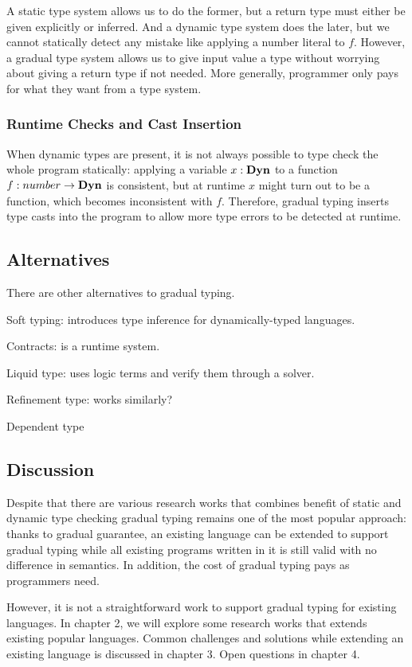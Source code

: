 A static type system allows us to do the former, but a return type must either
be given explicitly or inferred. And a dynamic type system does the later, but
we cannot statically detect any mistake like applying a number literal to $f$.
However, a gradual type system allows us to give input value a type
without worrying about giving a return type if not needed.
More generally, programmer only pays for what they want from a type system.


\subsubsection{Runtime Checks and Cast Insertion}


When dynamic types are present, it is not always possible to type check the whole
program statically: applying a variable $x : \textbf{Dyn}$ to a function $f : number \rightarrow \textbf{Dyn}$ is consistent, but at runtime $x$ might turn out to be a function, which becomes inconsistent
with $f$. Therefore, gradual typing inserts type casts into the program to allow
more type errors to be detected at runtime.


\subsection{Alternatives}

There are other alternatives to gradual typing.

Soft typing: introduces type inference for dynamically-typed languages.

Contracts: is a runtime system.

Liquid type: uses logic terms and verify them through a solver.

Refinement type: works similarly?

Dependent type

\subsection{Discussion}

Despite that there are various research works that combines
benefit of static and dynamic type checking
gradual typing remains one of the most popular approach:
thanks to gradual guarantee, an existing language can be extended to
support gradual typing while all existing programs written in it is still valid
with no difference in semantics. In addition, the cost of gradual typing pays
as programmers need.


However, it is not a straightforward work to support gradual typing for existing languages.
In chapter 2, we will explore some research works that extends existing popular languages.
Common challenges and solutions while extending an existing language is discussed in chapter 3.
Open questions in chapter 4.

